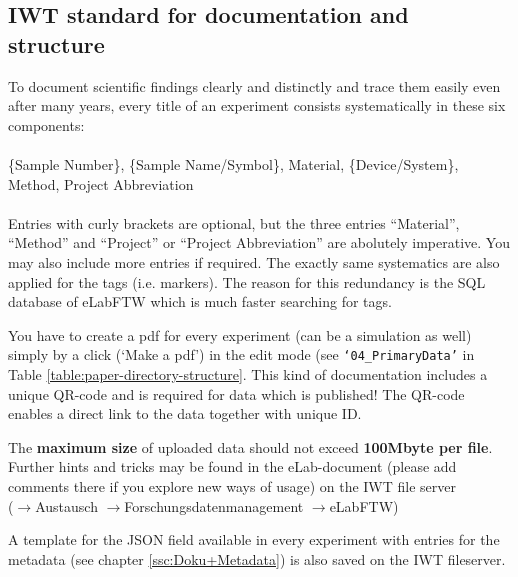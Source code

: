 \subsection{IWT standard for documentation and structure}

To document scientific findings clearly and distinctly and trace them easily even after many years, every title of an experiment consists systematically in these six components: \\
 \\
\{Sample Number\}, \{Sample Name/Symbol\}, Material, \{Device/System\}, Method, Project Abbreviation \\
 \\
Entries with curly brackets are optional, but the three entries ``Material'', ``Method'' and ``Project'' or ``Project Abbreviation'' are abolutely imperative. You may also include more entries if required. The exactly same systematics are also applied for the tags (i.e. markers). The reason for this redundancy is the SQL database of eLabFTW which is much faster searching for tags.

You have to create a pdf for every experiment (can be a simulation as well) simply by a click (`Make a pdf’) in the edit mode (see \texttt{‘04\_PrimaryData’} in Table \ref{table:paper-directory-structure}. This kind of documentation includes a unique QR-code and is required for data which is published! The QR-code enables a direct link to the data together with unique ID.

The \textbf{maximum size} of uploaded data should not exceed
\textbf{100Mbyte per file}. Further hints and tricks may be found in the eLab-document (please add comments there if you explore new ways of usage) on the IWT file server   \\ ($\rightarrow$Austausch $\rightarrow$Forschungsdatenmanagement $\rightarrow$eLabFTW)

A template for the JSON field available in every experiment with entries for the metadata (see chapter \ref{ssc:Doku+Metadata}) is also saved on the IWT fileserver.

